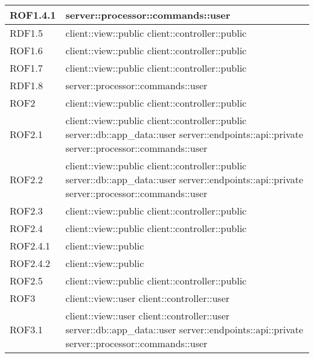 \begin{center}
\begin{longtable}{| p{4cm} | p{8cm} |}
\hline
ROF1.4.1 & server::processor::commands::user \\
\hline
RDF1.5 & client::view::public \newline client::controller::public \\
\hline
ROF1.6 & client::view::public \newline client::controller::public \\
\hline
ROF1.7 & client::view::public \newline client::controller::public \\
\hline
RDF1.8 & server::processor::commands::user \\
\hline
ROF2 & client::view::public \newline client::controller::public \\
\hline
ROF2.1 & client::view::public \newline client::controller::public \newline server::db::app\_data::user \newline server::endpoints::api::private \newline server::processor::commands::user \\
\hline
ROF2.2 & client::view::public \newline client::controller::public \newline server::db::app\_data::user \newline server::endpoints::api::private \newline server::processor::commands::user \\
\hline
ROF2.3 & client::view::public \newline client::controller::public \\
\hline
ROF2.4 & client::view::public \newline client::controller::public \\
\hline
ROF2.4.1 & client::view::public \\
\hline
ROF2.4.2 & client::view::public \\
\hline
ROF2.5 & client::view::public \newline client::controller::public \\
\hline
ROF3 & client::view::user \newline client::controller::user \\
\hline
ROF3.1 & client::view::user \newline client::controller::user \newline server::db::app\_data::user \newline server::endpoints::api::private \newline server::processor::commands::user \\

\end{longtable}
\end{center}
